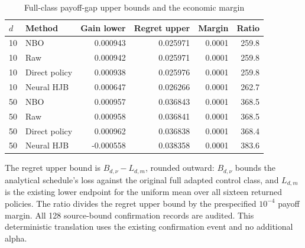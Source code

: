 \begin{table}[!htbp]
\centering\small
\caption{Full-class payoff-gap upper bounds and the economic margin}
\label{tab:r15absolute}
\begin{tabular}{llrrrr}
\toprule
$d$ & Method & Gain lower & Regret upper & Margin & Ratio \\
\midrule
10 & NBO & 0.000943 & 0.025971 & 0.0001 & 259.8 \\
10 & Raw & 0.000942 & 0.025971 & 0.0001 & 259.8 \\
10 & Direct policy & 0.000938 & 0.025976 & 0.0001 & 259.8 \\
10 & Neural HJB & 0.000647 & 0.026266 & 0.0001 & 262.7 \\
50 & NBO & 0.000957 & 0.036843 & 0.0001 & 368.5 \\
50 & Raw & 0.000958 & 0.036841 & 0.0001 & 368.5 \\
50 & Direct policy & 0.000962 & 0.036838 & 0.0001 & 368.4 \\
50 & Neural HJB & -0.000558 & 0.038358 & 0.0001 & 383.6 \\
\bottomrule
\end{tabular}
\par\medskip\noindent\footnotesize The regret upper bound is $B_{d,\nu}-L_{d,m}$, rounded outward: $B_{d,\nu}$ bounds the analytical schedule's loss against the original full adapted control class, and $L_{d,m}$ is the existing lower endpoint for the uniform mean over all sixteen returned policies. The ratio divides the regret upper bound by the prespecified $10^{-4}$ payoff margin. All 128 source-bound confirmation records are audited. This deterministic translation uses the existing confirmation event and no additional alpha.
\end{table}
